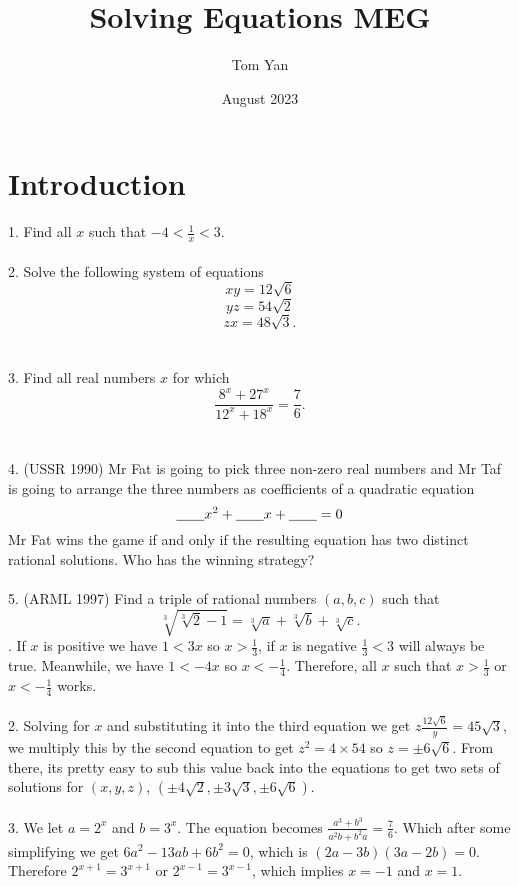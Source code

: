 \documentclass{article}
\title{Solving Equations MEG}
\author{Tom Yan}
\date{August 2023}
\begin{document}
\maketitle

\section{Introduction}
1. Find all $x$ such that $-4 < \frac{1}{x} < 3$.  \\\\
2. Solve the following system of equations $$xy = 12\sqrt{6}$$ $$yz=54\sqrt{2}$$ $$zx=48\sqrt{3}. $$\\\\
3. Find all real numbers $x$ for which $$\frac{8^x+27^x}{12^x+18^x}=\frac{7}{6}. $$  \\\\
4. (USSR 1990) Mr Fat is going to pick three non-zero real numbers and Mr Taf is going to arrange the three numbers as coefficients of a quadratic equation $$\underline{\hspace{0.7cm}}x^2 + \underline{\hspace{0.7cm}}x + \underline{\hspace{0.7cm}} = 0$$ Mr Fat wins the game if and only if the resulting equation has two distinct rational solutions. Who has the winning strategy?\\\\
5. (ARML 1997) Find a triple of rational numbers $(a,b,c)$ such that $$\sqrt[3]{\sqrt[3]{2}-1} = \sqrt[3]{a} + \sqrt[3]{b} + \sqrt[3]{c}.$$
. If $x$ is positive we have $1<3x$ so $x>\frac{1}{3}$, if $x$ is negative $\frac{1}{3}<3$ will always be true. Meanwhile, we have $1<-4x$ so $x<-\frac{1}{4}$. Therefore, all $x$ such that $x>\frac{1}{3}$ or $x<-\frac{1}{4}$ works. \\\\
2. Solving for $x$ and substituting it into the third equation we get $z\frac{12\sqrt{6}}{y}= 45\sqrt{3}$, we multiply this by the second equation to get $z^2=4\times 54$ so $z= \pm6\sqrt{6}$. From there, its pretty easy to sub this value back into the equations to get two sets of solutions for $(x,y,z)$, $(\pm 4\sqrt{2}, \pm 3\sqrt{3}, \pm 6\sqrt{6})$. \\\\
3. We let $a=2^x$ and $b=3^x$. The equation becomes $\frac{a^3+b^3}{a^2b+b^2a}=\frac{7}{6}$. Which after some simplifying we get $6a^2-13ab+6b^2=0$, which is $(2a-3b)(3a-2b)=0$. Therefore $2^{x+1}=3^{x+1}$ or $2^{x-1}=3^{x-1}$, which implies $x=-1$ and $x=1$.  \\\\
\end{document}
